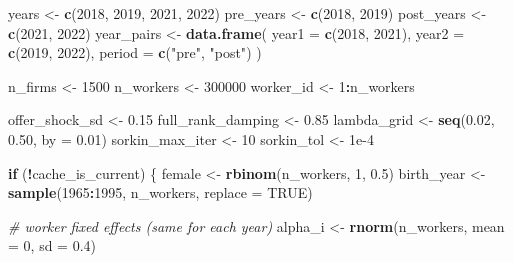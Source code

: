 \documentclass[
]{article}
\newenvironment{Shaded}{\begin{snugshade}}{\end{snugshade}}
\newcommand{\AttributeTok}[1]{\textcolor[rgb]{0.13,0.29,0.53}{#1}}
\newcommand{\CommentTok}[1]{\textcolor[rgb]{0.56,0.35,0.01}{\textit{#1}}}
\newcommand{\ConstantTok}[1]{\textcolor[rgb]{0.56,0.35,0.01}{#1}}
\newcommand{\ControlFlowTok}[1]{\textcolor[rgb]{0.13,0.29,0.53}{\textbf{#1}}}
\newcommand{\DecValTok}[1]{\textcolor[rgb]{0.00,0.00,0.81}{#1}}
\newcommand{\FloatTok}[1]{\textcolor[rgb]{0.00,0.00,0.81}{#1}}
\newcommand{\FunctionTok}[1]{\textcolor[rgb]{0.13,0.29,0.53}{\textbf{#1}}}
\newcommand{\NormalTok}[1]{#1}
\newcommand{\OtherTok}[1]{\textcolor[rgb]{0.56,0.35,0.01}{#1}}
\newcommand{\SpecialCharTok}[1]{\textcolor[rgb]{0.81,0.36,0.00}{\textbf{#1}}}
\newcommand{\StringTok}[1]{\textcolor[rgb]{0.31,0.60,0.02}{#1}}
\begin{document}
\begin{Shaded}
\begin{Highlighting}[]
\NormalTok{years }\OtherTok{\textless{}{-}} \FunctionTok{c}\NormalTok{(}\DecValTok{2018}\NormalTok{, }\DecValTok{2019}\NormalTok{, }\DecValTok{2021}\NormalTok{, }\DecValTok{2022}\NormalTok{)}
\NormalTok{pre\_years }\OtherTok{\textless{}{-}} \FunctionTok{c}\NormalTok{(}\DecValTok{2018}\NormalTok{, }\DecValTok{2019}\NormalTok{)}
\NormalTok{post\_years }\OtherTok{\textless{}{-}} \FunctionTok{c}\NormalTok{(}\DecValTok{2021}\NormalTok{, }\DecValTok{2022}\NormalTok{)}
\NormalTok{year\_pairs }\OtherTok{\textless{}{-}} \FunctionTok{data.frame}\NormalTok{(}
    \AttributeTok{year1 =} \FunctionTok{c}\NormalTok{(}\DecValTok{2018}\NormalTok{, }\DecValTok{2021}\NormalTok{),}
    \AttributeTok{year2 =} \FunctionTok{c}\NormalTok{(}\DecValTok{2019}\NormalTok{, }\DecValTok{2022}\NormalTok{),}
    \AttributeTok{period =} \FunctionTok{c}\NormalTok{(}\StringTok{"pre"}\NormalTok{, }\StringTok{"post"}\NormalTok{)}
\NormalTok{)}

\NormalTok{n\_firms }\OtherTok{\textless{}{-}} \DecValTok{1500}
\NormalTok{n\_workers }\OtherTok{\textless{}{-}} \DecValTok{300000}
\NormalTok{worker\_id }\OtherTok{\textless{}{-}} \DecValTok{1}\SpecialCharTok{:}\NormalTok{n\_workers}

\NormalTok{offer\_shock\_sd }\OtherTok{\textless{}{-}} \FloatTok{0.15}
\NormalTok{full\_rank\_damping }\OtherTok{\textless{}{-}} \FloatTok{0.85}
\NormalTok{lambda\_grid }\OtherTok{\textless{}{-}} \FunctionTok{seq}\NormalTok{(}\FloatTok{0.02}\NormalTok{, }\FloatTok{0.50}\NormalTok{, }\AttributeTok{by =} \FloatTok{0.01}\NormalTok{)}
\NormalTok{sorkin\_max\_iter }\OtherTok{\textless{}{-}} \DecValTok{10}
\NormalTok{sorkin\_tol }\OtherTok{\textless{}{-}} \FloatTok{1e{-}4}

\ControlFlowTok{if}\NormalTok{ (}\SpecialCharTok{!}\NormalTok{cache\_is\_current) \{}
\NormalTok{    female }\OtherTok{\textless{}{-}} \FunctionTok{rbinom}\NormalTok{(n\_workers, }\DecValTok{1}\NormalTok{, }\FloatTok{0.5}\NormalTok{)}
\NormalTok{    birth\_year }\OtherTok{\textless{}{-}} \FunctionTok{sample}\NormalTok{(}\DecValTok{1965}\SpecialCharTok{:}\DecValTok{1995}\NormalTok{, n\_workers, }\AttributeTok{replace =} \ConstantTok{TRUE}\NormalTok{)}

    \CommentTok{\# worker fixed effects (same for each year)}
\NormalTok{    alpha\_i }\OtherTok{\textless{}{-}} \FunctionTok{rnorm}\NormalTok{(n\_workers, }\AttributeTok{mean =} \DecValTok{0}\NormalTok{, }\AttributeTok{sd =} \FloatTok{0.4}\NormalTok{)}


\end{Highlighting}
\end{Shaded}
\end{document}

